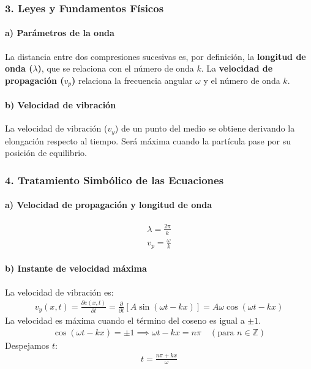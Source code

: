 \subsubsection*{3. Leyes y Fundamentos Físicos}
\paragraph*{a) Parámetros de la onda}
La distancia entre dos compresiones sucesivas es, por definición, la \textbf{longitud de onda ($\lambda$)}, que se relaciona con el número de onda $k$. La \textbf{velocidad de propagación ($v_p$)} relaciona la frecuencia angular $\omega$ y el número de onda $k$.
\paragraph*{b) Velocidad de vibración}
La velocidad de vibración ($v_y$) de un punto del medio se obtiene derivando la elongación respecto al tiempo. Será máxima cuando la partícula pase por su posición de equilibrio.

\subsubsection*{4. Tratamiento Simbólico de las Ecuaciones}
\paragraph*{a) Velocidad de propagación y longitud de onda}
\begin{gather}
    \lambda = \frac{2\pi}{k} \\
    v_p = \frac{\omega}{k}
\end{gather}
\paragraph*{b) Instante de velocidad máxima}
La velocidad de vibración es:
\begin{gather}
    v_y(x,t) = \frac{\partial e(x,t)}{\partial t} = \frac{\partial}{\partial t} [A\sin(\omega t - kx)] = A\omega\cos(\omega t - kx)
\end{gather}
La velocidad es máxima cuando el término del coseno es igual a $\pm 1$.
\begin{gather}
    \cos(\omega t - kx) = \pm 1 \implies \omega t - kx = n\pi \quad (\text{para } n \in \mathbb{Z})
\end{gather}
Despejamos $t$:
\begin{gather}
    t = \frac{n\pi + kx}{\omega}
\end{gather}

